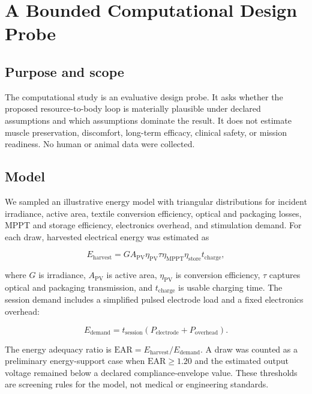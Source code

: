 \documentclass[runningheads]{llncs}
\begin{document}
\section{A Bounded Computational Design Probe}

\subsection{Purpose and scope}

The computational study is an evaluative design probe. It asks whether the proposed resource-to-body loop is materially plausible under declared assumptions and which assumptions dominate the result. It does not estimate muscle preservation, discomfort, long-term efficacy, clinical safety, or mission readiness. No human or animal data were collected.

\subsection{Model}

We sampled an illustrative energy model with triangular distributions for incident irradiance, active area, textile conversion efficiency, optical and packaging losses, MPPT and storage efficiency, electronics overhead, and stimulation demand. For each draw, harvested electrical energy was estimated as

\begin{equation}
E_{\mathrm{harvest}}=G A_{\mathrm{PV}}\eta_{\mathrm{PV}}\tau\eta_{\mathrm{MPPT}}\eta_{\mathrm{store}}t_{\mathrm{charge}},
\end{equation}

where $G$ is irradiance, $A_{\mathrm{PV}}$ is active area, $\eta_{\mathrm{PV}}$ is conversion efficiency, $\tau$ captures optical and packaging transmission, and $t_{\mathrm{charge}}$ is usable charging time. The session demand includes a simplified pulsed electrode load and a fixed electronics overhead:

\begin{equation}
E_{\mathrm{demand}}=t_{\mathrm{session}}(P_{\mathrm{electrode}}+P_{\mathrm{overhead}}).
\end{equation}

The energy adequacy ratio is $\mathrm{EAR}=E_{\mathrm{harvest}}/E_{\mathrm{demand}}$. A draw was counted as a preliminary energy-support case when $\mathrm{EAR}\geq1.20$ and the estimated output voltage remained below a declared compliance-envelope value. These thresholds are screening rules for the model, not medical or engineering standards.
\end{document}
